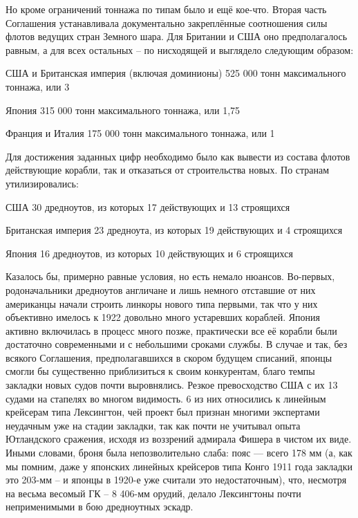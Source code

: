 Но кроме ограничений тоннажа по типам было и ещё кое-что. Вторая часть Соглашения устанавливала документально закреплённые соотношения силы флотов ведущих стран Земного шара. Для Британии и США оно предполагалось равным, а для всех остальных – по нисходящей и выглядело следующим образом:

США и Британская империя (включая доминионы) 525 000 тонн максимального тоннажа, или 3

Япония 315 000 тонн максимального тоннажа, или 1,75

Франция и Италия 175 000 тонн максимального тоннажа, или 1

Для достижения заданных цифр необходимо было как вывести из состава флотов действующие корабли, так и отказаться от строительства новых. По странам утилизировались:

США 30 дредноутов, из которых 17 действующих и 13 строящихся

Британская империя 23 дредноута, из которых 19 действующих и 4 строящихся

Япония 16 дредноутов, из которых 10 действующих и 6 строящихся

Казалось бы, примерно равные условия, но есть немало нюансов. Во-первых, родоначальники дредноутов англичане и лишь немного отставшие от них американцы начали строить линкоры нового типа первыми, так что у них объективно имелось к 1922 довольно много устаревших кораблей. Япония активно включилась в процесс много позже, практически все её корабли были достаточно современными и с небольшими сроками службы. В случае и так, без всякого Соглашения, предполагавшихся в скором будущем списаний, японцы смогли бы существенно приблизиться к своим конкурентам, благо темпы закладки новых судов почти выровнялись. Резкое превосходство США с их 13 судами на стапелях во многом видимость. 6 из них относились к линейным крейсерам типа Лексингтон, чей проект был признан многими экспертами неудачным уже на стадии закладки, так как почти не учитывал опыта Ютландского сражения, исходя из воззрений адмирала Фишера в чистом их виде. Иными словами, броня была непозволительно слаба: пояс — всего 178 мм (а, как мы помним, даже у японских линейных крейсеров типа Конго 1911 года закладки это 203-мм – и японцы в 1920-е уже считали это недостаточным), что, несмотря на весьма весомый ГК – 8 406-мм орудий, делало Лексингтоны почти неприменимыми в бою дредноутных эскадр. 

